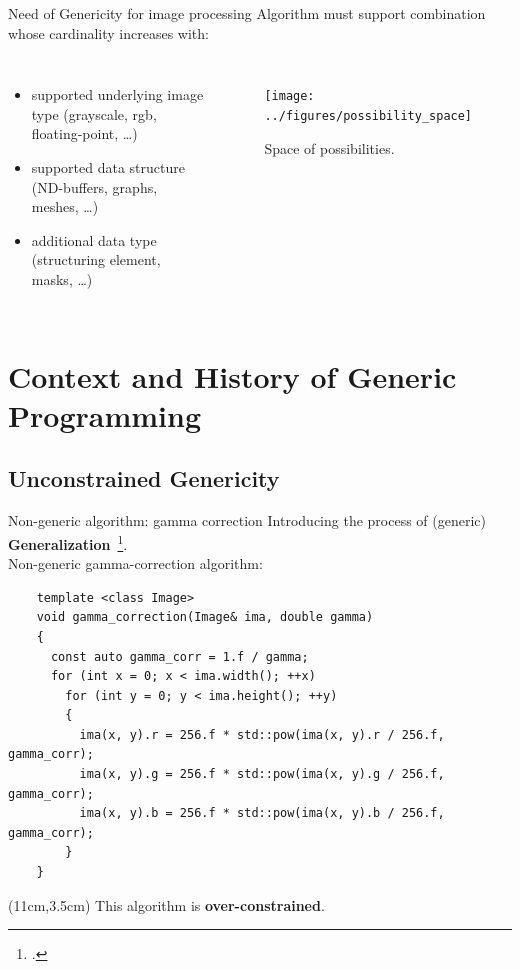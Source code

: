\documentclass[12pt,aspectratio=169]{beamer}
\begin{document}
\begin{frame}[fragile]{Need of Genericity for image processing}
  Algorithm must support combination whose cardinality increases with:

  \begin{columns}[T,onlytextwidth]
    \begin{itemize}
      \item supported underlying image type (grayscale, rgb, floating-point, \ldots)
      \item supported data structure (ND-buffers, graphs, meshes, \ldots)
      \item additional data type (structuring element, masks, \ldots)
    \end{itemize}

    \begin{figure}[htbp]
      \centering
      \texttt{[image: ../figures/possibility\_space]}
      \caption{Space of possibilities.}
      \label{fig:int.possibility_space}
    \end{figure}
  \end{columns}
\end{frame}

%
%
%


\section[Context and History of Generic Programming]{Context and History of Generic Programming}

\subsection[Unconstrained Genericity]{Unconstrained Genericity}

\begin{frame}[fragile]{Non-generic algorithm: gamma correction}
  Introducing the process of (generic) \textbf{Generalization}~\footcite{roynard.2019.rrpr}. \\
  Non-generic gamma-correction algorithm:
  \vspace{-0.3cm}
  \begin{verbatim}
    template <class Image>
    void gamma_correction(Image& ima, double gamma)
    {
      const auto gamma_corr = 1.f / gamma;
      for (int x = 0; x < ima.width(); ++x)
        for (int y = 0; y < ima.height(); ++y)
        {
          ima(x, y).r = 256.f * std::pow(ima(x, y).r / 256.f, gamma_corr);
          ima(x, y).g = 256.f * std::pow(ima(x, y).g / 256.f, gamma_corr);
          ima(x, y).b = 256.f * std::pow(ima(x, y).b / 256.f, gamma_corr);
        }
    }
  \end{verbatim}
  \begin{textblock*}{4cm}(11cm,3.5cm)
    This algorithm is \textbf{over-constrained}.
  \end{textblock*}
\end{frame}
\end{document}

